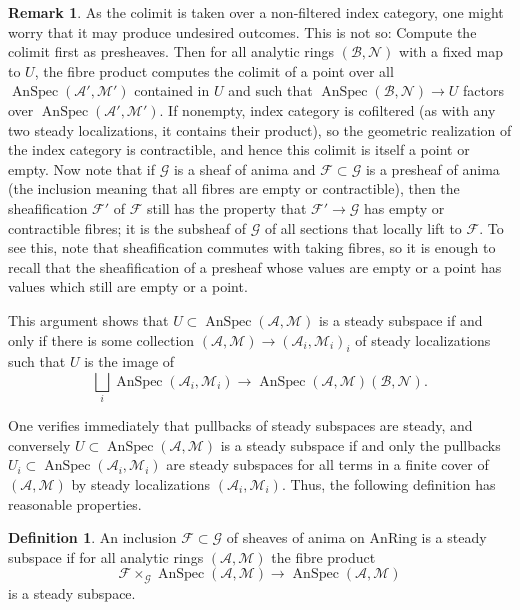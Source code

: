\documentclass[11pt]{amsbook}
\newcommand{\AnRing}{{\mathrm{AnRing}}}
\DeclareMathOperator{\AnSpec}{AnSpec}
\numberwithin{equation}{section}
\numberwithin{theorem}{section}
\theoremstyle{definition}
\newtheorem{remark}[theorem]{Remark}
\newtheorem{definition}[theorem]{Definition}
\begin{document}
\begin{remark} As the colimit is taken over a non-filtered index category, one might worry that it may produce undesired outcomes. This is not so: Compute the colimit first as presheaves. Then for all analytic rings $(\mathcal B,\mathcal N)$ with a fixed map to $U$, the fibre product computes the colimit of a point over all $\AnSpec(\mathcal A',\mathcal M')$ contained in $U$ and such that $\AnSpec(\mathcal B,\mathcal N)\to U$ factors over $\AnSpec(\mathcal A',\mathcal M')$. If nonempty, index category is cofiltered (as with any two steady localizations, it contains their product), so the geometric realization of the index category is contractible, and hence this colimit is itself a point or empty. Now note that if $\mathcal G$ is a sheaf of anima and $\mathcal F\subset \mathcal G$ is a presheaf of anima (the inclusion meaning that all fibres are empty or contractible), then the sheafification $\mathcal F'$ of $\mathcal F$ still has the property that $\mathcal F'\to \mathcal G$ has empty or contractible fibres; it is the subsheaf of $\mathcal G$ of all sections that locally lift to $\mathcal F$. To see this, note that sheafification commutes with taking fibres, so it is enough to recall that the sheafification of a presheaf whose values are empty or a point has values which still are empty or a point.

This argument shows that $U\subset \AnSpec(\mathcal A,\mathcal M)$ is a steady subspace if and only if there is some collection $(\mathcal A,\mathcal M)\to (\mathcal A_i,\mathcal M_i)_i$ of steady localizations such that $U$ is the image of
\[
\bigsqcup_i \AnSpec(\mathcal A_i,\mathcal M_i)\to \AnSpec(\mathcal A,\mathcal M)(\mathcal B,\mathcal N).
\]
\end{remark}

One verifies immediately that pullbacks of steady subspaces are steady, and conversely $U\subset \AnSpec(\mathcal A,\mathcal M)$ is a steady subspace if and only the pullbacks $U_i\subset \AnSpec(\mathcal A_i,\mathcal M_i)$ are steady subspaces for all terms in a finite cover of $(\mathcal A,\mathcal M)$ by steady localizations $(\mathcal A_i,\mathcal M_i)$. Thus, the following definition has reasonable properties.

\begin{definition} An inclusion $\mathcal F\subset \mathcal G$ of sheaves of anima on $\AnRing$ is a steady subspace if for all analytic rings $(\mathcal A,\mathcal M)$ the fibre product
\[
\mathcal F\times_{\mathcal G} \AnSpec(\mathcal A,\mathcal M)\to \AnSpec(\mathcal A,\mathcal M)
\]
is a steady subspace.
\end{definition}
\end{document}

